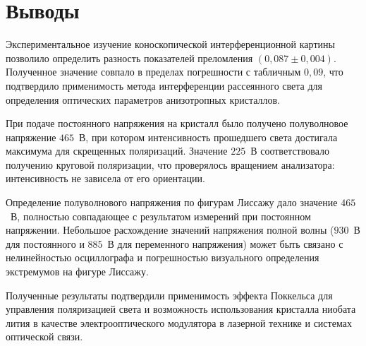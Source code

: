 \chapter{Выводы} \vspace{-20pt}
\label{ch:conclusions}


Экспериментальное изучение коноскопической интерференционной картины позволило определить разность показателей преломления $(0,087 \pm 0,004)$. Полученное значение совпало в пределах погрешности с табличным $0,09$, что подтвердило применимость метода интерференции рассеянного света для определения оптических параметров анизотропных кристаллов.

При подаче постоянного напряжения на кристалл было получено полуволновое напряжение $465$~В, при котором интенсивность прошедшего света достигала максимума для скрещенных поляризаций. Значение $225$~В соответствовало получению круговой поляризации, что проверялось вращением анализатора: интенсивность не зависела от его ориентации.

Определение полуволнового напряжения по фигурам Лиссажу дало значение $465$~В, полностью совпадающее с результатом измерений при постоянном напряжении. Небольшое расхождение значений напряжения полной волны ($930$~В для постоянного и $885$~В для переменного напряжения) может быть связано с нелинейностью осциллографа и погрешностью визуального определения экстремумов на фигуре Лиссажу.

Полученные результаты подтвердили применимость эффекта Поккельса для управления поляризацией света и возможность использования кристалла ниобата лития в качестве электрооптического модулятора в лазерной технике и системах оптической связи.

